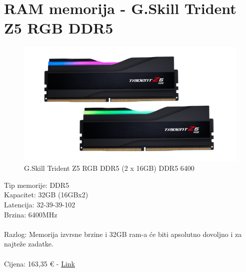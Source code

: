 \documentclass{report}
\begin{document}
\pagebreak

\section{RAM memorija - G.Skill Trident Z5 RGB DDR5}
\begin{figure}[H]
    \centering
    \includegraphics[scale=0.17]{Slike/gskillram.png}
    \caption{G.Skill Trident Z5 RGB DDR5 (2 x 16GB) DDR5 6400}
    \label{fig:ram}
\end{figure}
Tip memorije: DDR5\\Kapacitet: 32GB (16GBx2)\\Latencija: 32-39-39-102\\Brzina: 6400MHz\\\\Razlog: Memorija izvrsne brzine i 32GB ram-a će biti apsolutno dovoljno i za najteže zadatke.\\\\Cijena: 163,35 € - \href{https://www.instar-informatika.hr/memorija-gskill-trident-z5-rgb-32gb-2x16gb-ddr5-6400mhz-cl32/148852/product/}{Link}

\pagebreak
\end{document}
